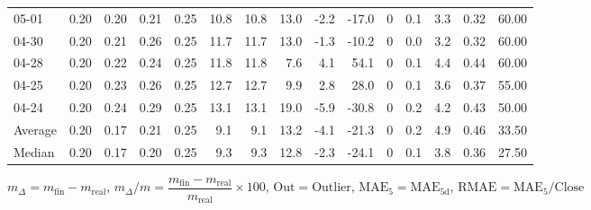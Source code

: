 \begin{threeparttable}
{\begin{tabular}{lrrrrrrrrrrrrrr}
  05-01 &          0.20 &          0.20 &          0.21 &        0.25 &                10.8 &               10.8 &                13.0 &       -2.2 &        -17.0 &              0 &                 0.1 &              3.3 &            0.32 &                  60.00 \\
  04-30 &          0.20 &          0.21 &          0.26 &        0.25 &                11.7 &               11.7 &                13.0 &       -1.3 &        -10.2 &              0 &                 0.0 &              3.2 &            0.32 &                  60.00 \\
  04-28 &          0.20 &          0.22 &          0.24 &        0.25 &                11.8 &               11.8 &                 7.6 &        4.1 &         54.1 &              0 &                 0.1 &              4.4 &            0.44 &                  60.00 \\
  04-25 &          0.20 &          0.23 &          0.26 &        0.25 &                12.7 &               12.7 &                 9.9 &        2.8 &         28.0 &              0 &                 0.1 &              3.6 &            0.37 &                  55.00 \\
  04-24 &          0.20 &          0.24 &          0.29 &        0.25 &                13.1 &               13.1 &                19.0 &       -5.9 &        -30.8 &              0 &                 0.2 &              4.2 &            0.43 &                  50.00 \\
Average &          0.20 &          0.17 &          0.21 &        0.25 &                 9.1 &                9.1 &                13.2 &       -4.1 &        -21.3 &              0 &                 0.2 &              4.9 &            0.46 &                  33.50 \\
 Median &          0.20 &          0.17 &          0.20 &        0.25 &                 9.3 &                9.3 &                12.8 &       -2.3 &        -24.1 &              0 &                 0.1 &              3.8 &            0.36 &                  27.50 \\
\bottomrule
\end{tabular}
}
\begin{tablenotes}\footnotesize
\item $m_\Delta=m_{\text{fin}}-m_{\text{real}}$,
$m_\Delta/m=\dfrac{m_{\text{fin}}-m_{\text{real}}}{m_{\text{real}}}\times100$,
$\mathrm{Out}=\text{Outlier}$,
$\mathrm{MAE}_5=\mathrm{MAE}_{5\text{d}}$,
$\mathrm{RMAE}=\mathrm{MAE}_5/\text{Close}$
\end{tablenotes}
\end{threeparttable}
\endgroup

